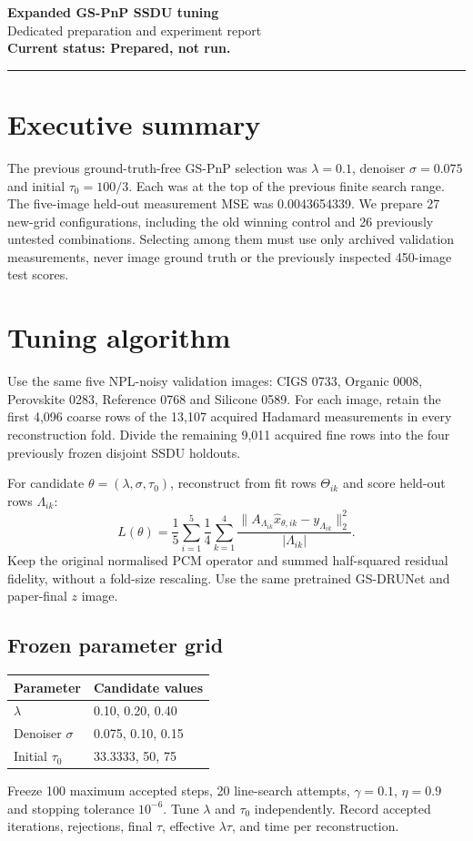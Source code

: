 \documentclass[10pt,a4paper]{article}
\begin{document}
{\LARGE\bfseries Expanded GS-PnP SSDU tuning}\\[4pt]
{\large Dedicated preparation and experiment report}\\[4pt]
\textbf{Current status: Prepared, not run.}
\par\medskip\hrule
\section{Executive summary}
The previous ground-truth-free GS-PnP selection was
\(\lambda=0.1\), denoiser \(\sigma=0.075\) and
initial \(\tau_0=100/3\). Each was at the top of
the previous finite search range. The five-image held-out
measurement MSE was 0.0043654339.
We prepare 27 new-grid configurations, including the
old winning control and 26 previously untested combinations.
Selecting among them must use only archived validation
measurements, never image ground truth or the previously
inspected 450-image test scores.

\section{Tuning algorithm}
Use the same five NPL-noisy validation images:
CIGS 0733, Organic 0008, Perovskite 0283,
Reference 0768 and Silicone 0589.
For each image, retain the first 4,096 coarse rows
of the 13,107 acquired Hadamard measurements in
every reconstruction fold. Divide the remaining
9,011 acquired fine rows into the four previously
frozen disjoint SSDU holdouts.

For candidate \(\theta=(\lambda,\sigma,\tau_0)\),
reconstruct from fit rows \(\Theta_{ik}\)
and score held-out rows \(\Lambda_{ik}\):
\[
L(\theta)=\frac15\sum_{i=1}^{5}\frac14
\sum_{k=1}^{4}
\frac{\|A_{\Lambda_{ik}}\widehat{x}_{\theta,ik}
-y_{\Lambda_{ik}}\|_2^2}{|\Lambda_{ik}|}.
\]
Keep the original normalised PCM operator and summed
half-squared residual fidelity, without a fold-size
rescaling. Use the same pretrained GS-DRUNet and
paper-final \(z\) image.

\subsection*{Frozen parameter grid}
\begin{center}\begin{tabular}{ll}\toprule
Parameter & Candidate values\\\midrule
\(\lambda\) & 0.10, 0.20, 0.40\\
Denoiser \(\sigma\) & 0.075, 0.10, 0.15\\
Initial \(\tau_0\) & 33.3333, 50, 75\\\bottomrule
\end{tabular}\end{center}
Freeze 100 maximum accepted steps, 20 line-search attempts,
\(\gamma=0.1\), \(\eta=0.9\) and stopping
tolerance \(10^{-6}\). Tune \(\lambda\) and \(\tau_0\)
independently. Record accepted iterations,
rejections, final \(\tau\), effective
\(\lambda\tau\), and time per reconstruction.
\end{document}
